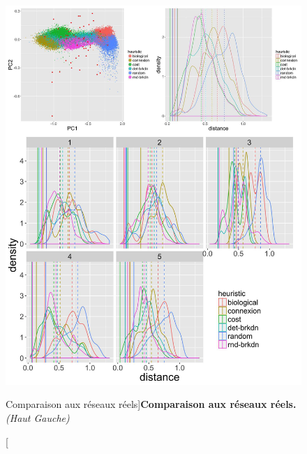 \begin{figure}
\includegraphics[width=\textwidth]{Figures/Final/7-1-2-fig-networkgrowth-realdistance}
\caption[][Comparaison aux réseaux réels]{}{\textbf{Comparaison aux réseaux réels.} \textit{(Haut Gauche)}\label{fig:networkgrowth:realdistance}}
\end{figure}




%


